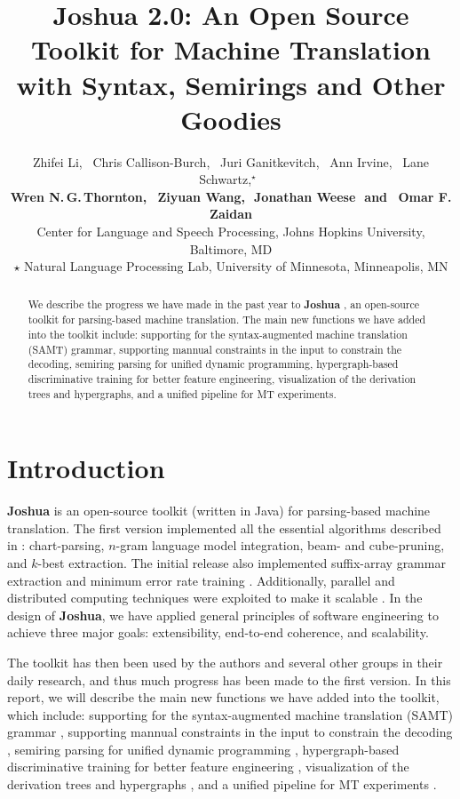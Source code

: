 \documentclass[11pt]{article}
\title{Joshua 2.0: An Open Source Toolkit for Machine Translation \\with Syntax, Semirings and Other Goodies }
\author{
Zhifei Li,\,\,\,
Chris Callison-Burch,\,\,\,
Juri Ganitkevitch,\,\,\,
Ann Irvine,\,\,\, 
Lane Schwartz,$^\star$\,\,\, 
\\ {\bf
Wren N.\,G.\,Thornton,\,\,\,
Ziyuan Wang,\,\,
Jonathan Weese\,\,
{\textnormal{and}}
\,\,\,Omar F. Zaidan}\\
Center for Language and Speech Processing, Johns Hopkins University, Baltimore, MD\\
$\star$ Natural Language Processing Lab, University of Minnesota, Minneapolis, MN }
\date{}
\newcommand{\joshua}{\textbf{Joshua}}
\begin{document}
\maketitle
\begin{abstract}
We describe the progress we have made in the past year to \textbf{Joshua} \cite{joshua-wmt09}, 
an open-source toolkit for parsing-based machine translation.
The main new functions we have added into the toolkit include: supporting for the syntax-augmented machine translation (SAMT) grammar,
supporting mannual constraints in the input to constrain the decoding,  
semiring parsing for unified dynamic programming, hypergraph-based 
discriminative training for better feature engineering, visualization of the derivation
trees and hypergraphs, and a unified pipeline for MT experiments.
\end{abstract}


\listoftodos

\section{Introduction}

\textbf{Joshua} \cite{joshua-wmt09} is an open-source toolkit (written in Java) for parsing-based machine translation.
The first version implemented all the essential algorithms described 
in : chart-parsing, $n$-gram language model integration, beam- and cube-pruning, and $k$-best extraction.  
The initial release also implemented suffix-array grammar extraction \cite{lopez:2007:EMNLP-CoNLL2007} 
and minimum error rate training \cite{och-mert}. 
Additionally, parallel and distributed computing techniques were exploited 
to make it scalable \cite{Joshua-old}. In the design of \joshua, we have applied general
principles of software engineering to achieve three
major goals: extensibility, end-to-end coherence,
and scalability.

The toolkit has then been used by the authors and several
other groups in their daily research, and thus much progress has
been made to the first version. 
In this report, we will describe the main new functions we have added into the 
toolkit, which include: supporting for the syntax-augmented machine translation (SAMT) grammar \cite{???},
supporting mannual constraints in the input to constrain the decoding \cite{???},  
semiring parsing for unified dynamic programming \cite{li-eisner:2009:EMNLP}, 
hypergraph-based discriminative training for better feature engineering \cite{oracle-extraction-naacl09}, 
visualization of the derivation trees and hypergraphs \cite{???}, 
and a unified pipeline for MT experiments \cite{???}.
\end{document}
